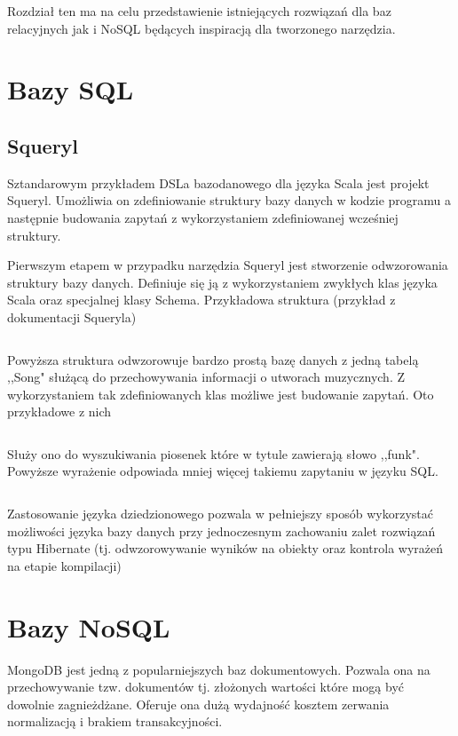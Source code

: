 \documentclass[brudnopis]{xmgr}
\begin{document}
Rozdział ten ma na celu przedstawienie istniejących rozwiązań dla baz relacyjnych jak i NoSQL będących inspiracją dla tworzonego narzędzia.

\section{Bazy SQL}

\subsection{Squeryl}

Sztandarowym przykładem DSLa bazodanowego dla języka Scala jest projekt Squeryl. Umożliwia on zdefiniowanie struktury bazy danych w kodzie programu a następnie budowania zapytań z wykorzystaniem zdefiniowanej wcześniej struktury.

Pierwszym etapem w przypadku narzędzia Squeryl jest stworzenie odwzorowania struktury bazy danych. Definiuje się ją z wykorzystaniem zwykłych klas języka Scala oraz specjalnej klasy Schema. Przykładowa struktura (przykład z dokumentacji Squeryla)

\inputminted{scala}{listings/scala/squeryl-schema.scala}

Powyższa struktura odwzorowuje bardzo prostą bazę danych z jedną tabelą ,,Song" służącą do przechowywania informacji o utworach muzycznych. Z wykorzystaniem tak zdefiniowanych klas możliwe jest budowanie zapytań. Oto przykładowe z nich

\inputminted{scala}{listings/scala/squeryl-query.scala}

Służy ono do wyszukiwania piosenek które w tytule zawierają słowo ,,funk". Powyższe wyrażenie odpowiada mniej więcej takiemu zapytaniu w języku SQL.

\inputminted{sql}{listings/sql/squeryl-query.sql}

Zastosowanie języka dziedzionowego pozwala w pełniejszy sposób wykorzystać możliwości języka bazy danych przy jednoczesnym zachowaniu zalet rozwiązań typu Hibernate (tj. odwzorowywanie wyników na obiekty oraz kontrola wyrażeń na etapie kompilacji)

\section{Bazy NoSQL}

MongoDB jest jedną z popularniejszych baz dokumentowych. Pozwala ona na przechowywanie tzw. dokumentów tj. złożonych wartości które mogą być dowolnie zagnieżdżane. Oferuje ona dużą wydajność kosztem zerwania normalizacją i brakiem transakcyjności.
\end{document}
